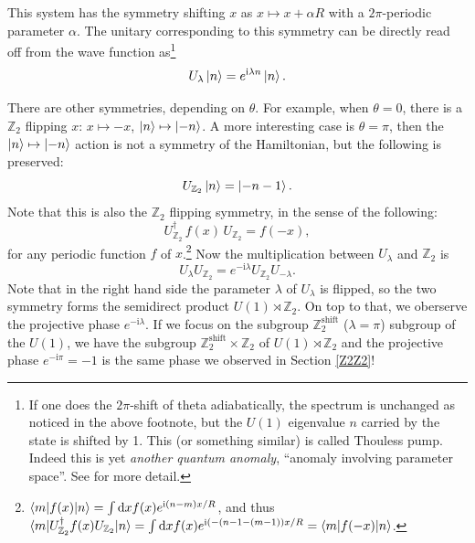 \documentclass[
]{scrartcl}
\numberwithin{equation}{section}
\theoremstyle{definition}
\theoremstyle{definition}
\theoremstyle{definition}
\theoremstyle{definition}
\theoremstyle{remark}
\begin{document}
This system has the symmetry shifting \(x\) as \(x \mapsto x+ \alpha R\) with a \(2\pi\)-periodic parameter \(\alpha\).
The unitary corresponding to this symmetry can be directly read off from the wave function as\footnote{If one does the \(2\pi\)-shift of theta adiabatically, the spectrum is unchanged as noticed in the above footnote, but the \(U(1)\) eigenvalue \(n\) carried by the state is shifted by 1. This (or something similar) is called Thouless pump.
  Indeed this is yet \emph{another quantum anomaly}, ``anomaly involving parameter space''. See \textcite{Cordova:2019jnf} for more detail.}
\begin{equation}
  \label{eq:U1shift}
  U_\lambda \ket{n} = e^{\mathrm{i}\lambda n}\ket{n}.
\end{equation}

There are other symmetries, depending on \(\theta\).
For example, when \(\theta = 0\), there is a \(\mathbb{Z}_2\) flipping \(x\): \(x\mapsto -x\), \(\ket{n} \mapsto \ket{-n}\).
A more interesting case is \(\theta = \pi\), then the \(\ket{n} \mapsto \ket{-n}\) action is not a symmetry of the Hamiltonian, but the following is preserved:
\begin{equation}
  \label{eq:Z2ThetaPi}
  U_{\mathbb{Z}_2}\ket{n} = \ket{-n-1}.
\end{equation}
Note that this is also the \(\mathbb{Z}_2\) flipping symmetry, in the sense of the following:
\begin{equation}
  \label{eq:UxU}
  U_{\mathbb{Z}_2}^\dagger \, f(x) \, U_{\mathbb{Z}_2} = f(-x),
\end{equation}
for any periodic function \(f\) of \(x\).\footnote{\(\braket{m|f(x)|n} = \int \mathrm{d}x f(x) e^{\mathrm{i}(n-m)x/R}\), and thus \(\braket{m|U^\dagger_{\mathbb{Z}_2}f(x)U_{\mathbb{Z}_2}|n} = \int \mathrm{d}x f(x) e^{\mathrm{i}(-(n-1-(m-1))x/R}= \braket{m|f(-x)|n}\).}
Now the multiplication between \(U_\lambda\) and \(\mathbb{Z}_2\) is
\begin{equation}
  \label{eq:U1Z2comu}
  U_\lambda U_{\mathbb{Z}_2} = e^{-\mathrm{i}\lambda}U_{\mathbb{Z}_2}U_{-\lambda}.
\end{equation}
Note that in the right hand side the parameter \(\lambda\) of \(U_{\lambda}\) is flipped, so the two symmetry forms the semidirect product \(U(1) \rtimes \mathbb{Z}_2\). On top to that, we oberserve the projective phase \(e^{-\mathrm{i}\lambda}\).
If we focus on the subgroup \(\mathbb{Z}_2^\text{shift}\) (\(\lambda = \pi\)) subgroup of the \(U(1)\), we have the subgroup \(\mathbb{Z}_2^\text{shift}\times \mathbb{Z}_2\) of \(U(1) \rtimes \mathbb{Z}_2\) and the projective phase \(e^{-\mathrm{i}\pi}=-1\) is the same phase we observed in Section \ref{Z2Z2}!
\end{document}
